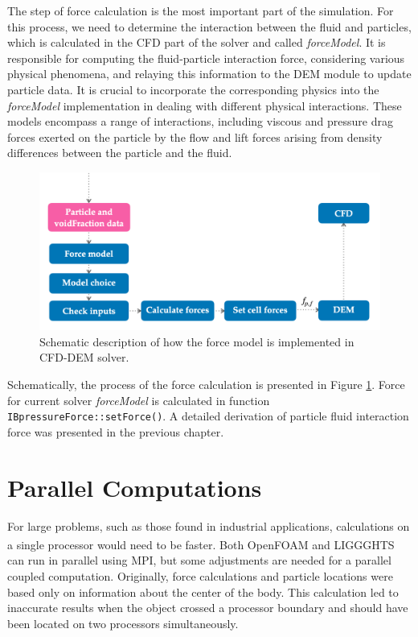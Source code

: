 The step of force calculation is the most important part of the simulation. For this process, we need to determine the interaction between the fluid and particles, which is calculated in the CFD part of the solver and called \textit{forceModel}. It is responsible for computing the fluid-particle interaction force, considering various physical phenomena, and relaying this information to the DEM module to update particle data. It is crucial to incorporate the corresponding physics into the \textit{forceModel} implementation in dealing with different physical interactions. These models encompass a range of interactions, including viscous and pressure drag forces exerted on the particle by the flow and lift forces arising from density differences between the particle and the fluid. 

\begin{figure}[!ht]
    \centering
    \includegraphics[width=15cm]{Images/chap3/force_model.png}
    \caption{Schematic description of how the force model is implemented in CFD-DEM solver.}
    \label{fig:force-model}
\end{figure}
Schematically, the process of the force calculation is presented in Figure \ref{fig:force-model}. Force for current solver \textit{forceModel} is calculated in function \verb|IBpressureForce::setForce()|. A detailed derivation of particle fluid interaction force was presented in the previous chapter. 


\section{Parallel Computations}

For large problems, such as those found in industrial applications, calculations on a single processor would need to be faster. Both OpenFOAM \textsuperscript{\textregistered} and LIGGGHTS \textsuperscript{\textregistered} can run in parallel using MPI, but some adjustments are needed for a parallel coupled computation. Originally, force calculations and particle locations were based only on information about the center of the body. This calculation led to inaccurate results when the object crossed a processor boundary and should have been located on two processors simultaneously.

